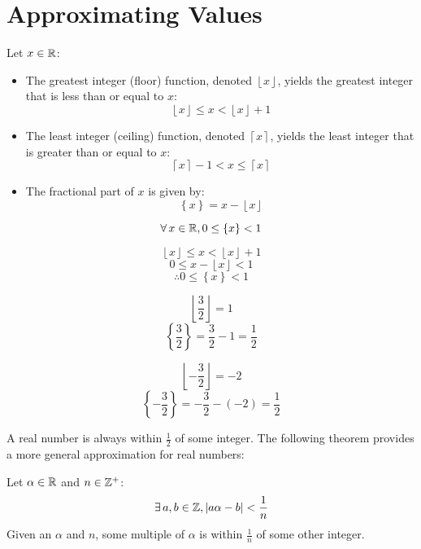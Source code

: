 \documentclass[letterpaper,12pt,fleqn]{article}
\renewcommand{\a}{\alpha}
\newcommand{\floor}[1]{\left\lfloor#1\right\rfloor}
\newcommand{\ceil}[1]{\left\lceil#1\right\rceil}
\newcommand{\fpart}[1]{\left\{#1\right\}}
\begin{document}
\section*{Approximating Values}

\begin{definition}
  Let $x\in\mathbb{R}$:
  \begin{itemize}
  \item The greatest integer (floor) function, denoted $\floor{x}$, yields the
    greatest integer that is less than or equal to $x$:
    \[\floor{x}\le x<\floor{x}+1\]

  \item The least integer (ceiling) function, denoted $\ceil{x}$, yields the
    least integer that is greater than or equal to $x$:
    \[\ceil{x}-1<x\le\ceil{x}\]

  \item The fractional part of $x$ is given by:
    \[\fpart{x}=x-\floor{x}\]
  \end{itemize}
\end{definition}

\begin{theorem}
  \[\forall\,x\in\R,0\le\fpart{x}<1\]
\end{theorem}

\begin{theproof}
    \[\floor{x}\le x<\floor{x}+1\]
    \[0\le x-\floor{x}<1\]
    \[\therefore 0\le\fpart{x}<1\]
\end{theproof}

\begin{example}
  \[\floor{\frac{3}{2}}=1\]
  \[\fpart{\frac{3}{2}}=\frac{3}{2}-1=\frac{1}{2}\]

  \[\floor{-\frac{3}{2}}=-2\]
  \[\fpart{-\frac{3}{2}}=-\frac{3}{2}-(-2)=\frac{1}{2}\]
\end{example}

A real number is always within $\frac{1}{2}$ of some integer. The following
theorem provides a more general approximation for real numbers:

\begin{theorem}
  Let $\a\in\R$ and $n\in\mathbb{Z}^+$:
  \[\exists\,a,b\in\Z,\abs{a\a-b}<\frac{1}{n}\]
  Given an $\a$ and $n$, some multiple of $\a$ is within $\frac{1}{n}$ of
  some other integer.
\end{theorem}
\end{document}
